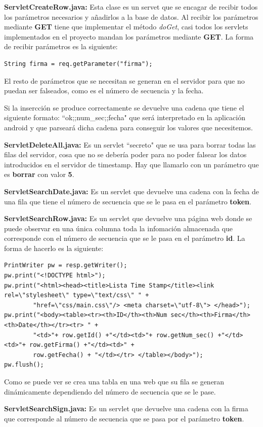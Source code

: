 \begin{description}
\item \textbf{ServletCreateRow.java:} Esta clase es un servet que se encagar de recibir todos los parámetros necesarios y añadirlos a la base de datos. Al recibir los parámetros mediante \textbf{GET} tiene que implementar el método \textit{doGet}, casi todos los servlets implementados en el proyecto mandan los parámetros mediante \textbf{GET}. La forma de recibir parámetros es la siguiente:

\begin{lstlisting}[style=Java]
String firma = req.getParameter("firma");
\end{lstlisting}

El resto de parámetros que se necesitan se generan en el servidor para que no puedan ser falseados, como es el número de secuencia y la fecha.

Si la insercción se produce correctamente se devuelve una cadena que tiene el siguiente formato: ``ok;;num\_sec;;fecha" que será interpretado en la aplicación android y que parseará dicha cadena para conseguir los valores que necesitemos.

\item \textbf{ServletDeleteAll.java:} Es un servlet ``secreto" que se usa para borrar todas las filas del servidor, cosa que no se debería poder para no poder falsear los datos introducidos en el servidor de timestamp. Hay que llamarlo con un parámetro que es \textbf{borrar} con valor \textbf{5}.

\item \textbf{ServletSearchDate.java:} Es un servlet que devuelve una cadena con la fecha de una fila que tiene el número de secuencia que se le pasa en el parámetro \textbf{token}.

\item \textbf{ServletSearchRow.java:} Es un servlet que devuelve una página web donde se puede observar en una única columna toda la infomación almacenada que corresponde con el número de secuencia que se le pasa en el parámetro \textbf{id}. La forma de hacerlo es la siguiente:

\begin{lstlisting}[style=Java]
PrintWriter pw = resp.getWriter();
pw.print("<!DOCTYPE html>");
pw.print("<html><head><title>Lista Time Stamp</title><link rel=\"stylesheet\" type=\"text/css\" " +
		"href=\"css/main.css\"/> <meta charset=\"utf-8\"> </head>");
pw.print("<body><table><tr><th>ID</th><th>Num sec</th><th>Firma</th><th>Date</th></tr><tr> " +
		"<td>"+ row.getId() +"</td><td>"+ row.getNum_sec() +"</td><td>"+ row.getFirma() +"</td><td>" +
		row.getFecha() + "</td></tr> </table></body>");
pw.flush();
\end{lstlisting}

Como se puede ver se crea una tabla en una web que su fila se generan dinámicamente dependiendo del número de secuencia que se le pase.

\item \textbf{ServletSearchSign.java:} Es un servlet que devuelve una cadena con la firma que corresponde al número de secuencia que se pasa por el parámetro \textbf{token}.
\end{description}

